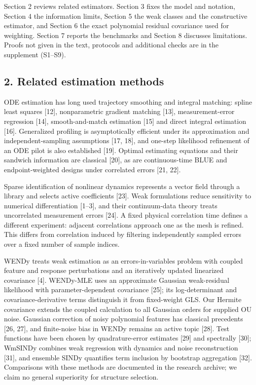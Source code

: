 \documentclass[
  american,
  11pt,
]{article}
\begin{document}
Section 2 reviews related estimators. Section 3 fixes the model and
notation, Section 4 the information limits, Section 5 the weak classes
and the constructive estimator, and Section 6 the exact polynomial
residual covariance used for weighting. Section 7 reports the benchmarks
and Section 8 discusses limitations. Proofs not given in the text,
protocols and additional checks are in the supplement (S1--S9).

\subsection{2. Related estimation
methods}\label{related-estimation-methods}

ODE estimation has long used trajectory smoothing and integral matching:
spline least squares {[}12{]}, nonparametric gradient matching {[}13{]},
measurement-error regression {[}14{]}, smooth-and-match estimation
{[}15{]} and direct integral estimation {[}16{]}. Generalized profiling
is asymptotically efficient under its approximation and
independent-sampling assumptions {[}17, 18{]}, and one-step likelihood
refinement of an ODE pilot is also established {[}19{]}. Optimal
estimating equations and their sandwich information are classical
{[}20{]}, as are continuous-time BLUE and endpoint-weighted designs
under correlated errors {[}21, 22{]}.

Sparse identification of nonlinear dynamics represents a vector field
through a library and selects active coefficients {[}23{]}. Weak
formulations reduce sensitivity to numerical differentiation {[}1--3{]},
and their continuum-data theory treats uncorrelated measurement errors
{[}24{]}. A fixed physical correlation time defines a different
experiment: adjacent correlations approach one as the mesh is refined.
This differs from correlation induced by filtering independently sampled
errors over a fixed number of sample indices.

WENDy treats weak estimation as an errors-in-variables problem with
coupled feature and response perturbations and an iteratively updated
linearized covariance {[}4{]}. WENDy-MLE uses an approximate Gaussian
weak-residual likelihood with parameter-dependent covariance {[}25{]};
its log-determinant and covariance-derivative terms distinguish it from
fixed-weight GLS. Our Hermite covariance extends the coupled calculation
to all Gaussian orders for supplied OU noise. Gaussian correction of
noisy polynomial features has classical precedents {[}26, 27{]}, and
finite-noise bias in WENDy remains an active topic {[}28{]}. Test
functions have been chosen by quadrature-error estimates {[}29{]} and
spectrally {[}30{]}; WmSINDy combines weak regression with dynamics and
noise reconstruction {[}31{]}, and ensemble SINDy quantifies term
inclusion by bootstrap aggregation {[}32{]}. Comparisons with these
methods are documented in the research archive; we claim no general
superiority for structure selection.
\end{document}
